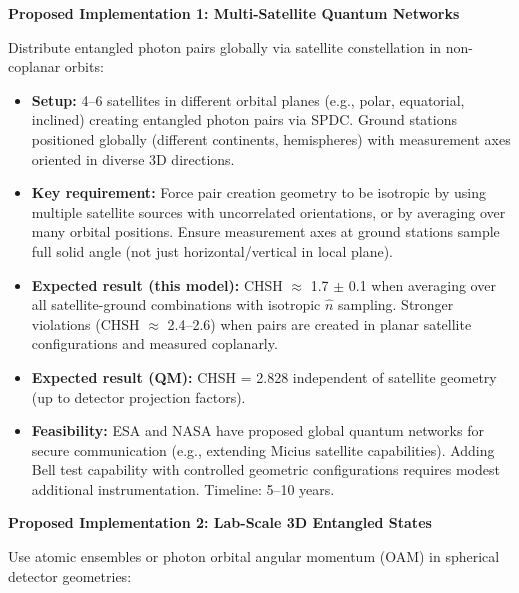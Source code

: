 \documentclass[11pt,a4paper]{article}
\theoremstyle{definition}
\theoremstyle{remark}
\begin{document}
\textbf{Proposed Implementation 1: Multi-Satellite Quantum Networks}

Distribute entangled photon pairs globally via satellite constellation in non-coplanar orbits:

\begin{itemize}
\item \textbf{Setup:} 4--6 satellites in different orbital planes (e.g., polar, equatorial, inclined) creating entangled photon pairs via SPDC. Ground stations positioned globally (different continents, hemispheres) with measurement axes oriented in diverse 3D directions.

\item \textbf{Key requirement:} Force pair creation geometry to be isotropic by using multiple satellite sources with uncorrelated orientations, or by averaging over many orbital positions. Ensure measurement axes at ground stations sample full solid angle (not just horizontal/vertical in local plane).

\item \textbf{Expected result (this model):} CHSH $\approx$ 1.7 $\pm$ 0.1 when averaging over all satellite-ground combinations with isotropic $\hat{n}$ sampling. Stronger violations (CHSH $\approx$ 2.4--2.6) when pairs are created in planar satellite configurations and measured coplanarly.

\item \textbf{Expected result (QM):} CHSH = 2.828 independent of satellite geometry (up to detector projection factors).

\item \textbf{Feasibility:} ESA and NASA have proposed global quantum networks for secure communication (e.g., extending Micius satellite capabilities). Adding Bell test capability with controlled geometric configurations requires modest additional instrumentation. Timeline: 5--10 years.
\end{itemize}

\textbf{Proposed Implementation 2: Lab-Scale 3D Entangled States}

Use atomic ensembles or photon orbital angular momentum (OAM) in spherical detector geometries:
\end{document}
